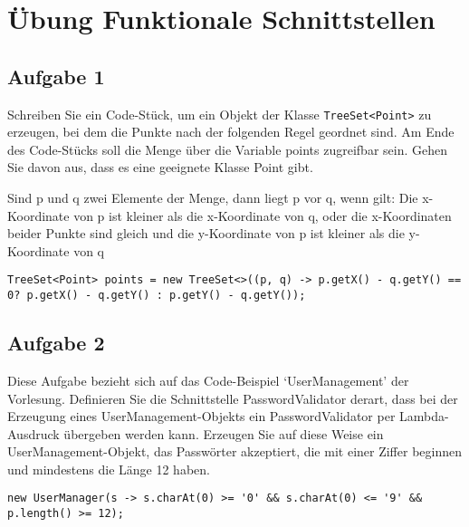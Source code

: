 \chapter{Übung Funktionale Schnittstellen}

\section{Aufgabe 1}
Schreiben Sie ein Code-Stück, um ein Objekt der Klasse
\lstinline{TreeSet<Point>} zu erzeugen, bei dem die Punkte nach der folgenden
Regel geordnet sind. Am Ende des Code-Stücks soll die Menge über die Variable
points zugreifbar sein. Gehen Sie davon aus, dass es eine geeignete Klasse
Point gibt.

Sind p und q zwei Elemente der Menge, dann liegt p vor q, wenn gilt: Die
x-Koordinate von p ist kleiner als die x-Koordinate von q, oder die
x-Koordinaten beider Punkte sind gleich und die y-Koordinate von p ist kleiner
als die y-Koordinate von q

\begin{lstlisting}
TreeSet<Point> points = new TreeSet<>((p, q) -> p.getX() - q.getY() == 0? p.getX() - q.getY() : p.getY() - q.getY());
\end{lstlisting}

\section{Aufgabe 2}
Diese Aufgabe bezieht sich auf das Code-Beispiel `UserManagement' der
Vorlesung. Definieren Sie die Schnittstelle PasswordValidator derart, dass bei
der Erzeugung eines UserManagement-Objekts ein PasswordValidator per
Lambda-Ausdruck übergeben werden kann. Erzeugen Sie auf diese Weise ein
UserManagement-Objekt, das Passwörter akzeptiert, die mit einer Ziffer beginnen
und mindestens die Länge 12 haben.

\begin{lstlisting}
new UserManager(s -> s.charAt(0) >= '0' && s.charAt(0) <= '9' && p.length() >= 12);
\end{lstlisting}

